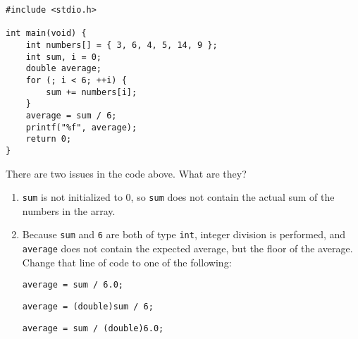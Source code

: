 \begin{verbatim}
#include <stdio.h>

int main(void) {
    int numbers[] = { 3, 6, 4, 5, 14, 9 };
    int sum, i = 0;
    double average;
    for (; i < 6; ++i) {
        sum += numbers[i];
    }
    average = sum / 6;
    printf("%f", average);
    return 0;
}
\end{verbatim}

There are two issues in the code above. What are they?

\begin{answer}
\begin{enumerate}
\item \texttt{sum} is not initialized to 0, so \texttt{sum} does not contain the actual sum of the numbers in the array.
\item Because \texttt{sum} and \texttt{6} are both of type \texttt{int}, integer division is performed, and \texttt{average} does not contain the expected average, but the floor of the average. Change that line of code to one of the following:
\begin{verbatim}
average = sum / 6.0;
\end{verbatim}
\begin{verbatim}
average = (double)sum / 6;
\end{verbatim}
\begin{verbatim}
average = sum / (double)6.0;
\end{verbatim}
\end{enumerate}
\end{answer}
